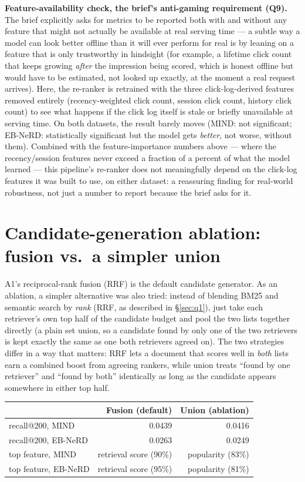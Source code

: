 \documentclass[11pt,a4paper]{article}
\begin{document}
\textbf{Feature-availability check, the brief's anti-gaming requirement (Q9).} The brief explicitly
asks for metrics to be reported both with and without any feature that might not actually be
available at real serving time --- a subtle way a model can look better offline than it will ever
perform for real is by leaning on a feature that is only trustworthy in hindsight (for example, a
lifetime click count that keeps growing \emph{after} the impression being scored, which is honest
offline but would have to be estimated, not looked up exactly, at the moment a real request
arrives). Here, the re-ranker is retrained with the three click-log-derived features removed
entirely (recency-weighted click count, session click count, history click count) to see what
happens if the click log itself is stale or briefly unavailable at serving time. On both datasets,
the result barely moves (MIND: not significant; EB-NeRD: statistically significant but the model
gets \emph{better}, not worse, without them). Combined with the feature-importance numbers above
--- where the recency/session features never exceed a fraction of a percent of what the model
learned --- this pipeline's re-ranker does not meaningfully depend on the click-log features it
was built to use, on either dataset: a reassuring finding for real-world robustness, not just a
number to report because the brief asks for it.

\section{Candidate-generation ablation: fusion vs.\ a simpler union}
\label{sec:candidate-gen}

A1's reciprocal-rank fusion (RRF) is the default candidate generator. As an ablation, a simpler
alternative was also tried: instead of blending BM25 and semantic search by \emph{rank} (RRF, as
described in \S\ref{sec:q1}), just take each retriever's own top half of the candidate budget and
pool the two lists together directly (a plain set union, so a candidate found by only one of the
two retrievers is kept exactly the same as one both retrievers agreed on). The two strategies
differ in a way that matters: RRF lets a document that scores well in \emph{both} lists earn a
combined boost from agreeing rankers, while union treats ``found by one retriever'' and ``found by
both'' identically as long as the candidate appears somewhere in either top half.

\begin{center}
\begin{tabular}{@{}lrr@{}}
\toprule
 & \textbf{Fusion (default)} & \textbf{Union (ablation)} \\
\midrule
recall@200, MIND & 0.0439 & 0.0416 \\
recall@200, EB-NeRD & 0.0263 & 0.0249 \\
top feature, MIND & retrieval score (90\%) & popularity (83\%) \\
top feature, EB-NeRD & retrieval score (95\%) & popularity (81\%) \\
\bottomrule
\end{tabular}
\end{center}
\end{document}
